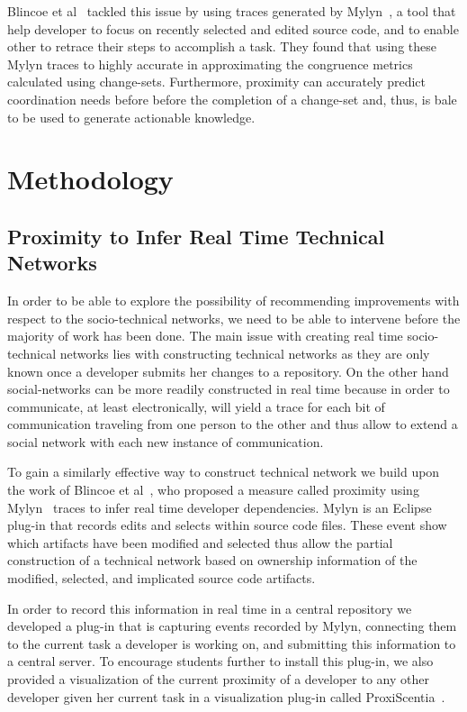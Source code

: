 Blincoe et al~\cite{} tackled this issue by using traces generated by Mylyn~\cite{}, a tool that help developer to focus on recently selected and edited source code, and to enable other to retrace their steps to accomplish a task.
They found that using these Mylyn traces to highly accurate in approximating the congruence metrics calculated using change-sets.
Furthermore, proximity can accurately predict coordination needs before before the completion of a change-set and, thus, is bale to be used to generate actionable knowledge.

\section{Methodology}
\subsection{Proximity to Infer Real Time Technical Networks}
In order to be able to explore the possibility of recommending improvements with respect to the socio-technical networks, we need to be able to intervene before the majority of work has been done.
The main issue with creating real time socio-technical networks lies with constructing technical networks as they are only known once a developer submits her changes to a repository.
On the other hand social-networks can be more readily constructed in real time because in order to communicate, at least electronically, will yield a trace for each bit of communication traveling from one person to the other and thus allow to extend a social network with each new instance of communication.

To gain a similarly effective way to construct technical network we build upon the work of Blincoe et al~\cite{}, who proposed a measure called proximity using Mylyn~\cite{} traces to infer real time developer dependencies.
Mylyn is an Eclipse plug-in that records edits and selects within source code files.
These event show which artifacts have been modified and selected thus allow the partial construction of a technical network based on ownership information of the modified, selected, and implicated source code artifacts.

In order to record this information in real time in a central repository we developed a plug-in that is capturing events recorded by Mylyn, connecting them to the current task a developer is working on, and submitting this information to a central server. 
To encourage students further to install this plug-in, we also provided a visualization of the current proximity of a developer to any other developer given her current task in a visualization plug-in called ProxiScentia~\cite{}.


